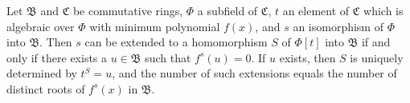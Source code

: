Let $\mathfrak{B}$ and $\mathfrak{C}$ be commutative rings, $\Phi$ a subfield of $\mathfrak{C}$, $t$ an element of $\mathfrak{C}$ which is algebraic over $\Phi$ with minimum polynomial $f(x)$, and $s$ an isomorphism of $\Phi$ into $\mathfrak{B}$. Then $s$ can be extended to a homomorphism $S$ of $\Phi[t]$ into $\mathfrak{B}$ if and only if there exists a $u \in \mathfrak{B}$ such that $f^s(u) = 0$. If $u$ exists, then $S$ is uniquely determined by $t^S = u$, and the number of such extensions equals the number of distinct roots of $f^s(x)$ in $\mathfrak{B}$.
